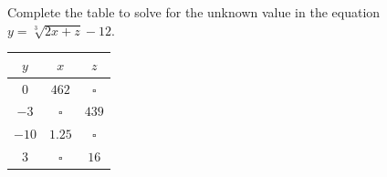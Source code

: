 \documentclass[border=6pt]{standalone}
\begin{document}
\begin{minipage}{12cm}
\centering
Complete the table to solve for the unknown value in the equation $y=\sqrt[3]{2x+z}-12$.\\[1em]
\begin{tabular}{@{} c c c @{}}
\toprule
$y$ & $x$ & $z$ \\
\midrule
$0$    & $462$  & $\square$ \\
$-3$   & $\square$ & $439$ \\
$-10$  & $1.25$ & $\square$ \\
$3$    & $\square$ & $16$ \\
\bottomrule
\end{tabular}
\end{minipage}
\end{document}
